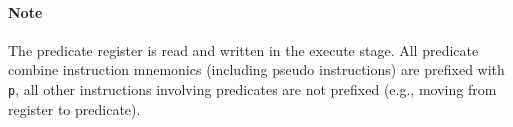 \documentclass[a4paper,fontsize=10pt,twoside,DIV15,BCOR12mm,headinclude=true,footinclude=false,pagesize,bibtotoc]{scrbook}
\newcommand{\comment}[3]{

\textsf{\textbf{#1}} {\color{#3}#2}}
\newcommand{\stefan}[1]{\comment{Stefan}{#1}{RoyalPurple}}
\renewcommand{\stefan}[1]{}
\newcommand{\bitsunused}{\rule{\width}{\height}}
\begin{document}
\paragraph{Note}
The predicate register is read and written in the execute stage.
All predicate combine instruction mnemonics (including pseudo instructions) are prefixed with \texttt{p},
all other instructions involving predicates are not prefixed (e.g., moving from register to predicate).

\stefan{We have a mov with two registers (\texttt{add}), mov with two predicates (\texttt{por}), a mov from register to
predicate (\texttt{cmpnez}), as well as mov from register bit to predicate (\texttt{btest}), but we are missing a
mov from predicate to register (is now a predicated set and predicated clr), and mov from predicate to register bit (is now done with
bitmasks).}

%
%
%
%
\end{document}
